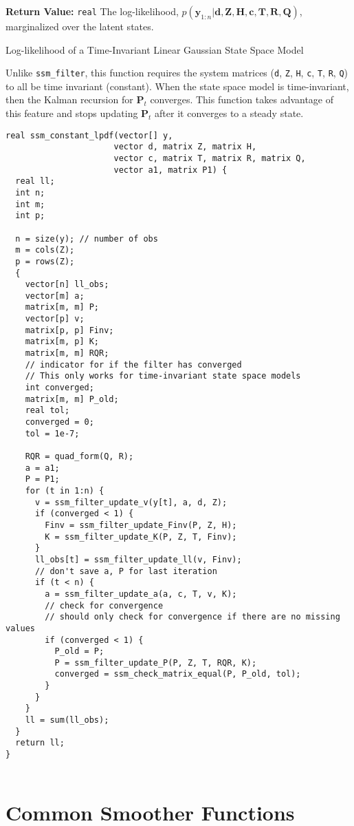 \documentclass[]{book}
\newcommand{\mat}[1]{\boldsymbol{#1}}
\renewcommand{\vec}[1]{\boldsymbol{#1}}
\begin{document}
\textbf{Return Value:} \texttt{real} The log-likelihood,
\(p(\vec{y}_{1:n} | \vec{d}, \mat{Z}, \mat{H}, \vec{c}, \mat{T}, \mat{R}, \mat{Q})\),
marginalized over the latent states.

Log-likelihood of a Time-Invariant Linear Gaussian State Space Model

Unlike \texttt{ssm\_filter}, this function requires the system matrices
(\texttt{d}, \texttt{Z}, \texttt{H}, \texttt{c}, \texttt{T}, \texttt{R},
\texttt{Q}) to all be time invariant (constant). When the state space
model is time-invariant, then the Kalman recursion for \(\mat{P}_t\)
converges. This function takes advantage of this feature and stops
updating \(\mat{P}_t\) after it converges to a steady state.

\begin{verbatim}
real ssm_constant_lpdf(vector[] y,
                      vector d, matrix Z, matrix H,
                      vector c, matrix T, matrix R, matrix Q,
                      vector a1, matrix P1) {
  real ll;
  int n;
  int m;
  int p;

  n = size(y); // number of obs
  m = cols(Z);
  p = rows(Z);
  {
    vector[n] ll_obs;
    vector[m] a;
    matrix[m, m] P;
    vector[p] v;
    matrix[p, p] Finv;
    matrix[m, p] K;
    matrix[m, m] RQR;
    // indicator for if the filter has converged
    // This only works for time-invariant state space models
    int converged;
    matrix[m, m] P_old;
    real tol;
    converged = 0;
    tol = 1e-7;

    RQR = quad_form(Q, R);
    a = a1;
    P = P1;
    for (t in 1:n) {
      v = ssm_filter_update_v(y[t], a, d, Z);
      if (converged < 1) {
        Finv = ssm_filter_update_Finv(P, Z, H);
        K = ssm_filter_update_K(P, Z, T, Finv);
      }
      ll_obs[t] = ssm_filter_update_ll(v, Finv);
      // don't save a, P for last iteration
      if (t < n) {
        a = ssm_filter_update_a(a, c, T, v, K);
        // check for convergence
        // should only check for convergence if there are no missing values
        if (converged < 1) {
          P_old = P;
          P = ssm_filter_update_P(P, Z, T, RQR, K);
          converged = ssm_check_matrix_equal(P, P_old, tol);
        }
      }
    }
    ll = sum(ll_obs);
  }
  return ll;
}


\end{verbatim}

\section{Common Smoother Functions}\label{common-smoother-functions}
\end{document}
